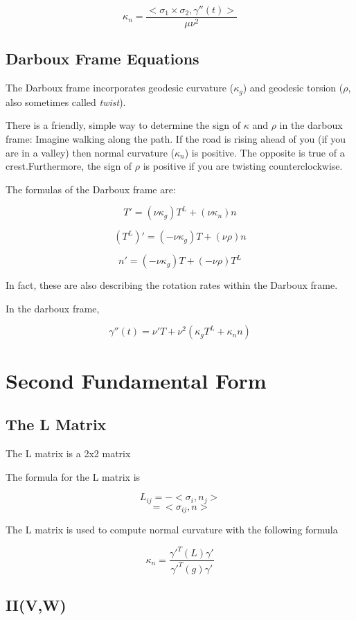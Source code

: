 \documentclass{article}
\begin{document}
\[ \kappa_{n} = \frac{<\sigma_1 \times \sigma_2, \gamma''(t)>}{\mu \nu^2} \]

\subsection{Darboux Frame Equations}

The Darboux frame incorporates geodesic curvature ($\kappa_g$) and geodesic torsion ($\rho$, also sometimes called {\it{twist}}).

There is a friendly, simple way to determine the sign of $\kappa$ and $\rho$ in the darboux frame: Imagine walking along the path. If the road is rising ahead of you (if you are in a valley) then normal curvature ($\kappa_n$) is positive. The opposite is true of a crest.Furthermore, the sign of $\rho$ is positive if you are twisting counterclockwise.

The formulas of the Darboux frame are:

\[ T' = (\nu \kappa_{g})T^L + (\nu \kappa_{n})n\]

\[(T^L)' = (- \nu  \kappa_{g})T + (\nu \rho)n\]

\[n' =  (- \nu  \kappa_{g})T + (-\nu \rho)T^L\]

In fact, these are also describing the rotation rates within the Darboux frame.

In the darboux frame,

\[ \gamma''(t) = \nu'T + \nu^2 (\kappa_{g} T^L + \kappa_{n} n) \]

\section{Second Fundamental Form}

\subsection{The L Matrix}

The L matrix is a 2x2 matrix 

The formula for the L matrix is

\[ L_{ij} = -<\sigma_{i}, n_{j}> \]
\[ = <\sigma_{ij}, n> \]

The L matrix is used to compute normal curvature with the following formula

\[ \kappa_{n} = \frac{\gamma'^T (L) \gamma'}{\gamma'^T (g) \gamma'}\]

\subsection{II(V,W)}
\end{document}
